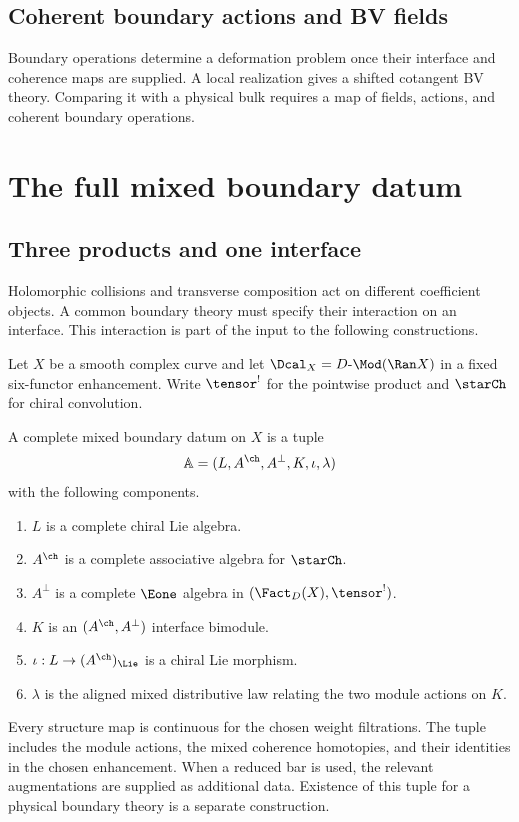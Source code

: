 \cleardoublepage
{}
{}
\chapter*{Coherent boundary actions and BV fields}
\begin{summarybox}
Boundary operations determine a deformation problem once their interface and coherence maps are supplied. A local realization gives a shifted cotangent BV theory. Comparing it with a physical bulk requires a map of fields, actions, and coherent boundary operations.
\end{summarybox}
\part{The full mixed boundary datum}

\chapter{Three products and one interface}
Holomorphic collisions and transverse composition act on different coefficient objects. A common boundary theory must specify their interaction on an interface. This interaction is part of the input to the following constructions.

Let $X$ be a smooth complex curve and let $\Dcal_X=D\text{-}\Mod(\Ran X)$ in a fixed six-functor enhancement.  Write $\tensor^!$ for the pointwise product and $\starCh$ for chiral convolution.

\begin{definition}
A complete mixed boundary datum on $X$ is a tuple
\[
 \mathbb A=(L,A^{\ch},A^\perp,K,\iota,\lambda)
\]
with the following components.
\begin{enumerate}
\item $L$ is a complete chiral Lie algebra.
\item $A^{\ch}$ is a complete associative algebra for $\starCh$.
\item $A^\perp$ is a complete $\Eone$ algebra in $(\Fact_D(X),\tensor^!)$.
\item $K$ is an $(A^{\ch},A^\perp)$ interface bimodule.
\item $\iota:L\to(A^{\ch})_{\Lie}$ is a chiral Lie morphism.
\item $\lambda$ is the aligned mixed distributive law relating the two module actions on $K$.
\end{enumerate}
Every structure map is continuous for the chosen weight filtrations. The tuple includes the module actions, the mixed coherence homotopies, and their identities in the chosen enhancement. When a reduced bar is used, the relevant augmentations are supplied as additional data. Existence of this tuple for a physical boundary theory is a separate construction.
\end{definition}

